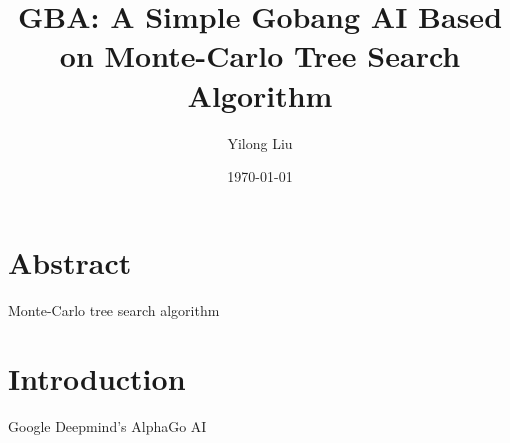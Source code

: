 \documentclass[UTF8]{ctexart}
\title{GBA: A Simple Gobang AI Based on Monte-Carlo Tree Search Algorithm}
\author{Yilong Liu}
\date{\today}
\begin{document}
\maketitle
\newpage
\tableofcontents
\newpage

\section*{Abstract}
Monte-Carlo tree search algorithm\cite{DBLP:conf/ecml/KocsisS06}\cite{DBLP:conf/aiide/ChaslotBSS08}

\section{Introduction}
Google Deepmind's AlphaGo AI\cite{DBLP:journals/nature/SilverHMGSDSAPL16}\cite{silver2017mastering}



\end{document}
